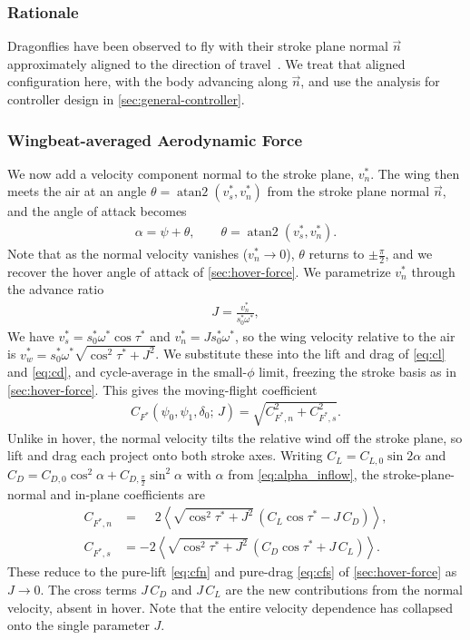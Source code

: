\documentclass[11pt,letterpaper]{article}
\begin{document}
\subsubsection{Rationale}

Dragonflies have been observed to fly with their
stroke plane normal $\vec{n}$ approximately aligned to
the direction of travel~\cite{azuma1985}. We treat that
aligned configuration here, with the body advancing along
$\vec{n}$, and use the analysis for controller design in
\autoref{sec:general-controller}.

\subsubsection{Wingbeat-averaged Aerodynamic Force}\label{sec:spn-force}

We now add a velocity component normal to the stroke plane, $v_n^*$.
The wing then meets the air at an angle
$\theta = \operatorname{atan2}(v_s^*, v_n^*)$ from the
stroke plane normal $\vec{n}$, and the angle of attack becomes
\begin{align}
    \alpha = \psi + \theta, \qquad \theta = \operatorname{atan2}(v_s^*, v_n^*). \label{eq:alpha_inflow}
\end{align}
Note that as the normal velocity vanishes ($v_n^* \to 0$), $\theta$ returns
to $\pm\tfrac\pi2$, and we recover the hover angle of attack of
\autoref{sec:hover-force}.
We parametrize $v_n^*$ through the advance ratio
\begin{align}
    J = \frac{v_n^*}{s_0^* \omega^*},
\end{align}
We have $v_s^* = s_0^* \omega^* \cos\tau^*$ and $v_n^* = J s_0^* \omega^*$,
so the wing velocity relative to the air is $v_w^* = s_0^* \omega^* \sqrt{\cos^2\tau^* + J^2}$.
We substitute these into the lift and drag of \autoref{eq:cl} and \autoref{eq:cd},
and cycle-average in the small-$\phi$ limit, freezing the stroke basis as in
\autoref{sec:hover-force}. This gives the moving-flight
coefficient
\begin{align}
    C_{F^*}(\psi_0, \psi_1, \delta_0;\, J) = \sqrt{C_{F^*,n}^2 + C_{F^*,s}^2}.
\end{align}
Unlike in hover, the normal velocity tilts the relative wind off the stroke plane,
so lift and drag each project onto both stroke axes. Writing
$C_L = C_{L,0} \sin 2\alpha$ and
$C_D = C_{D,0} \cos^2\alpha + C_{D,\frac{\pi}{2}} \sin^2\alpha$ with $\alpha$
from \autoref{eq:alpha_inflow}, the stroke-plane-normal and in-plane coefficients are
\begin{align}
    C_{F^*,n} &= \phantom{-}2\left\langle \sqrt{\cos^2\tau^* + J^2}\,\left( C_L \cos\tau^* - J\,C_D \right) \right\rangle, \\
    C_{F^*,s} &= -2\left\langle \sqrt{\cos^2\tau^* + J^2}\,\left( C_D \cos\tau^* + J\,C_L \right) \right\rangle.
\end{align}
These reduce to the pure-lift \autoref{eq:cfn} and pure-drag
\autoref{eq:cfs} of \autoref{sec:hover-force} as $J \to 0$. The cross terms
$J\,C_D$ and $J\,C_L$ are the new contributions from the normal velocity, absent in hover.
Note that the entire velocity dependence has collapsed onto the single parameter $J$.
\end{document}
